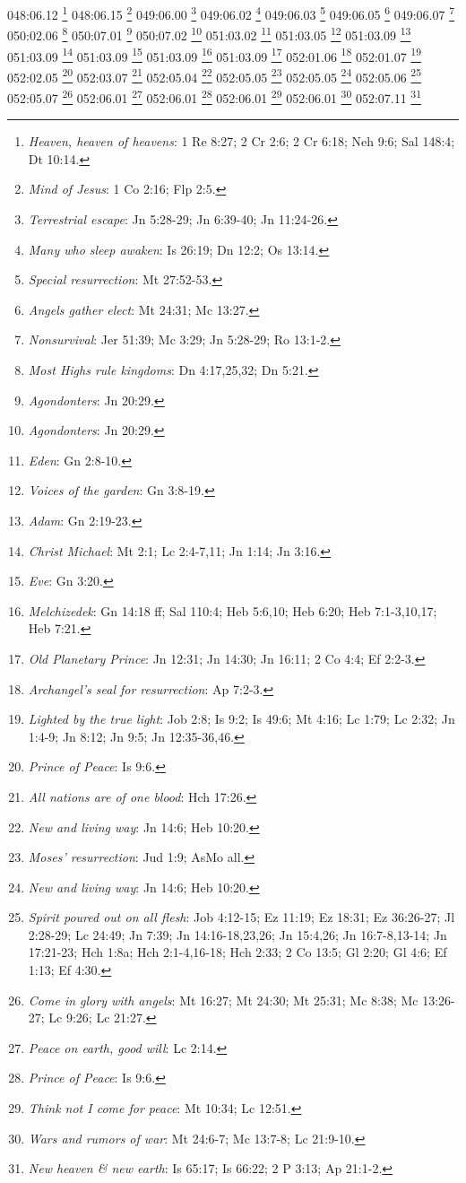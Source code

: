 {{{{{{{{{{{{{{{{{{{{{{048:06.12 \footnote{\textit{Heaven, heaven of heavens}: 1 Re 8:27; 2 Cr 2:6; 2 Cr 6:18; Neh 9:6; Sal 148:4; Dt 10:14.}
048:06.15 \footnote{\textit{Mind of Jesus}: 1 Co 2:16; Flp 2:5.}
049:06.00 \footnote{\textit{Terrestrial escape}: Jn 5:28-29; Jn 6:39-40; Jn 11:24-26.}
049:06.02 \footnote{\textit{Many who sleep awaken}: Is 26:19; Dn 12:2; Os 13:14.}
049:06.03 \footnote{\textit{Special resurrection}: Mt 27:52-53.}
049:06.05 \footnote{\textit{Angels gather elect}: Mt 24:31; Mc 13:27.}
049:06.07 \footnote{\textit{Nonsurvival}: Jer 51:39; Mc 3:29; Jn 5:28-29; Ro 13:1-2.}
050:02.06 \footnote{\textit{Most Highs rule kingdoms}: Dn 4:17,25,32; Dn 5:21.}
050:07.01 \footnote{\textit{Agondonters}: Jn 20:29.}
050:07.02 \footnote{\textit{Agondonters}: Jn 20:29.}
051:03.02 \footnote{\textit{Eden}: Gn 2:8-10.}
051:03.05 \footnote{\textit{Voices of the garden}: Gn 3:8-19.}
051:03.09 \footnote{\textit{Adam}: Gn 2:19-23.}
051:03.09 \footnote{\textit{Christ Michael}: Mt 2:1; Lc 2:4-7,11; Jn 1:14; Jn 3:16.}
051:03.09 \footnote{\textit{Eve}: Gn 3:20.}
051:03.09 \footnote{\textit{Melchizedek}: Gn 14:18 ff; Sal 110:4; Heb 5:6,10; Heb 6:20; Heb 7:1-3,10,17; Heb 7:21.}
051:03.09 \footnote{\textit{Old Planetary Prince}: Jn 12:31; Jn 14:30; Jn 16:11; 2 Co 4:4; Ef 2:2-3.}
052:01.06 \footnote{\textit{Archangel's seal for resurrection}: Ap 7:2-3.}
052:01.07 \footnote{\textit{Lighted by the true light}: Job 2:8; Is 9:2; Is 49:6; Mt 4:16; Lc 1:79; Lc 2:32; Jn 1:4-9; Jn 8:12; Jn 9:5; Jn 12:35-36,46.}
052:02.05 \footnote{\textit{Prince of Peace}: Is 9:6.}
052:03.07 \footnote{\textit{All nations are of one blood}: Hch 17:26.}
052:05.04 \footnote{\textit{New and living way}: Jn 14:6; Heb 10:20.}
052:05.05 \footnote{\textit{Moses' resurrection}: Jud 1:9; AsMo all.}
052:05.05 \footnote{\textit{New and living way}: Jn 14:6; Heb 10:20.}
052:05.06 \footnote{\textit{Spirit poured out on all flesh}: Job 4:12-15; Ez 11:19; Ez 18:31; Ez 36:26-27; Jl 2:28-29; Lc 24:49; Jn 7:39; Jn 14:16-18,23,26; Jn 15:4,26; Jn 16:7-8,13-14; Jn 17:21-23; Hch 1:8a; Hch 2:1-4,16-18; Hch 2:33; 2 Co 13:5; Gl 2:20; Gl 4:6; Ef 1:13; Ef 4:30.}
052:05.07 \footnote{\textit{Come in glory with angels}: Mt 16:27; Mt 24:30; Mt 25:31; Mc 8:38; Mc 13:26-27; Lc 9:26; Lc 21:27.}
052:06.01 \footnote{\textit{Peace on earth, good will}: Lc 2:14.}
052:06.01 \footnote{\textit{Prince of Peace}: Is 9:6.}
052:06.01 \footnote{\textit{Think not I come for peace}: Mt 10:34; Lc 12:51.}
052:06.01 \footnote{\textit{Wars and rumors of war}: Mt 24:6-7; Mc 13:7-8; Lc 21:9-10.}
052:07.11 \footnote{\textit{New heaven & new earth}: Is 65:17; Is 66:22; 2 P 3:13; Ap 21:1-2.}
}}}}}}}}}}}}}}}}}}}}}}

